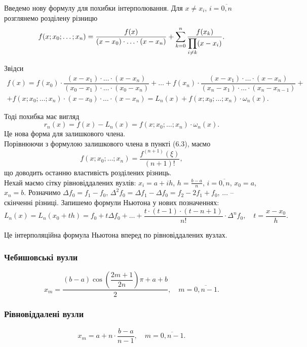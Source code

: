 Введемо нову формулу для похибки інтерполювання. Для $x \ne x_i$, $i = \overline{0,n}$ розглянемо розділену різницю
\[ f(x;x_0;\ldots;x_n) = \dfrac{f(x)}{(x-x_0)\cdot\ldots\cdot(x-x_n)} + \displaystyle\sum\limits_{k=0}^n \dfrac{f(x_k)}{\displaystyle\prod\limits_{i\ne k}(x-x_i)}.\]

Звідси
\begin{multline*}
    f(x) = f(x_0) \cdot \dfrac{(x-x_1)\cdot\ldots\cdot(x-x_n)}{(x_0-x_1)\cdot\ldots\cdot(x_0-x_n)} + \ldots + f(x_n) \cdot \dfrac{(x-x_1)\cdot\ldots\cdot(x-x_n)}{(x_n-x_1)\cdot\ldots\cdot(x_n-x_{n-1})} + \\
    + f(x;x_0;\ldots;x_n)\cdot(x-x_0)\cdot\ldots\cdot(x-x_n)=L_n(x)+f(x;x_0;\ldots;x_n)\cdot\omega_n(x).
\end{multline*}

Тоді похибка має вигляд
\begin{equation}
    \label{eq:6.19}
    r_n(x) = f(x) - L_n(x) = f(x;x_0;\ldots;x_n)\cdot\omega_n(x).
\end{equation}
Це нова форма для залишкового члена.\\

Порівнюючи з формулою залишкового члена в пункті (6.3), маємо
\[ f(x;x_0;\ldots;x_n) = \dfrac{f^{(n+1)}(\xi)}{(n+1)!},\]
що доводить останню властивість розділених різниць. \\

Нехай маємо сітку рівновіддалених вузлів: $x_i = a + i h$, $h = \frac{b-a}{n}$, $i = \overline{0, n}$, $x_0 = a$, $x_n = b$. Розначимо $\Delta f_0 = f_1 - f_0$, $\Delta^2f_0 = \Delta f_1 - \Delta f_0 = f_2 - 2 f_1 + f_0$, $\ldots$ -- скінченні різниці. Запишемо формули Ньютона у нових позначеннях:
\[ L_n(x) = L_n(x_0 + t h) = f_0 + t \Delta f_0 + \ldots + \dfrac{t\cdot(t-1)\cdot(t-n+1)}{n!}\cdot \Delta^n f_0, \quad t = \dfrac{x-x_0}{h}.\]

Це інтерполяційна формула Ньютона вперед по рівновіддалених вузлах.

\subsubsection{Чебишовські вузли}

\[ x_m = \dfrac{(b-a)\cos\left(\dfrac{2m+1}{2n}\right)\pi+a+b}{2}, \quad m=\overline{0,n-1}.\]
 
\subsubsection{Рівновіддалені вузли}

\[ x_m = a + n \cdot \dfrac{b-a}{n-1}, \quad m=\overline{0,n-1}.\]

